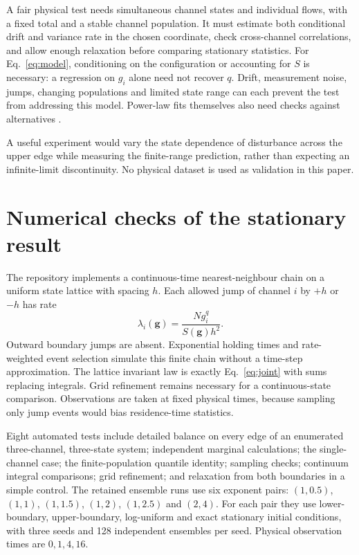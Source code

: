 \documentclass[11pt,a4paper]{article}
\begin{document}
A fair physical test needs simultaneous channel states and individual flows,
with a fixed total and a stable channel population. It must estimate both
conditional drift and variance rate in the chosen coordinate, check cross-channel
correlations, and allow enough relaxation before comparing stationary statistics.
For Eq.~\eqref{eq:model}, conditioning on the configuration or accounting for $S$
is necessary: a regression on $g_i$ alone need not recover $q$. Drift, measurement
noise, jumps, changing populations and limited state range can each prevent the
test from addressing this model. Power-law fits themselves also need checks
against alternatives \cite{clauset}.

A useful experiment would vary the state dependence of disturbance across the
upper edge while measuring the finite-range prediction, rather than expecting
an infinite-limit discontinuity. No physical dataset is used as validation in
this paper.



\section{Numerical checks of the stationary result}

The repository implements a continuous-time nearest-neighbour chain on a uniform
state lattice with spacing $h$. Each allowed jump of channel $i$ by $+h$ or $-h$
has rate
\begin{equation}
 \lambda_i(\mathbf g)=\frac{N g_i^q}{S(\mathbf g)h^2}.
\end{equation}
Outward boundary jumps are absent. Exponential holding times and rate-weighted
event selection simulate this finite chain without a time-step approximation.
The lattice invariant law is exactly Eq.~\eqref{eq:joint} with sums replacing
integrals. Grid refinement remains necessary for a continuous-state comparison.
Observations are taken at fixed physical times, because sampling only jump
events would bias residence-time statistics.

Eight automated tests include detailed balance on every edge of an enumerated
three-channel, three-state system; independent marginal calculations; the
single-channel case; the finite-population quantile identity; sampling checks;
continuum integral comparisons; grid refinement; and relaxation from both
boundaries in a simple control. The retained ensemble runs use six exponent pairs:
$(1,0.5)$, $(1,1)$, $(1,1.5)$, $(1,2)$, $(1,2.5)$ and $(2,4)$.
For each pair they use lower-boundary, upper-boundary, log-uniform and exact
stationary initial conditions, with three seeds and 128 independent ensembles
per seed. Physical observation times are $0,1,4,16$.
\end{document}
